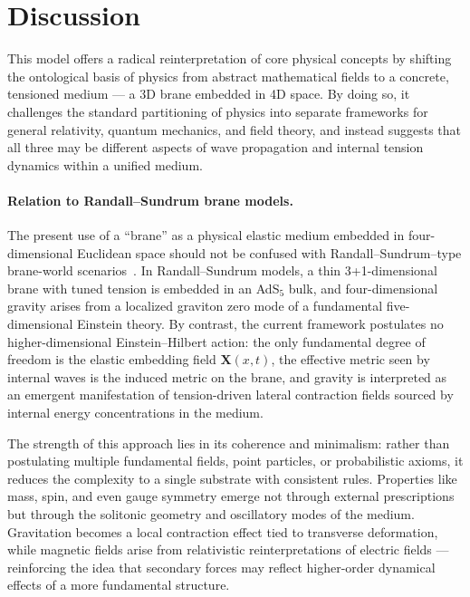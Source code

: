 \section{Discussion}\label{discussion}

This model offers a radical reinterpretation of core physical concepts
by shifting the ontological basis of physics from abstract mathematical
fields to a concrete, tensioned medium --- a 3D brane embedded in 4D
space. By doing so, it challenges the standard partitioning of physics
into separate frameworks for general relativity, quantum mechanics, and
field theory, and instead suggests that all three may be different
aspects of wave propagation and internal tension dynamics within a
unified medium.

\paragraph{Relation to Randall--Sundrum brane models.}
The present use of a ``brane'' as a physical elastic medium embedded in four-dimensional Euclidean space should not be confused with Randall--Sundrum--type brane-world scenarios~\cite{RandallSundrum1999}. In Randall--Sundrum models, a thin 3+1-dimensional brane with tuned tension is embedded in an AdS$_5$ bulk, and four-dimensional gravity arises from a localized graviton zero mode of a fundamental five-dimensional Einstein theory. By contrast, the current framework postulates no higher-dimensional Einstein--Hilbert action: the only fundamental degree of freedom is the elastic embedding field $\mathbf{X}(x,t)$, the effective metric seen by internal waves is the induced metric on the brane, and gravity is interpreted as an emergent manifestation of tension-driven lateral contraction fields sourced by internal energy concentrations in the medium.

The strength of this approach lies in its coherence and minimalism:
rather than postulating multiple fundamental fields, point particles, or
probabilistic axioms, it reduces the complexity to a single substrate
with consistent rules. Properties like mass, spin, and even gauge
symmetry emerge not through external prescriptions but through the
solitonic geometry and oscillatory modes of the medium. Gravitation
becomes a local contraction effect tied to transverse deformation, while
magnetic fields arise from relativistic reinterpretations of electric
fields --- reinforcing the idea that secondary forces may reflect
higher-order dynamical effects of a more fundamental structure.

